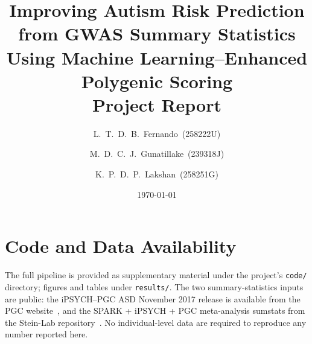 \documentclass[11pt,a4paper]{article}
\title{Improving Autism Risk Prediction from GWAS Summary Statistics
       Using Machine Learning--Enhanced Polygenic Scoring \\[0.3em]
       \large Project Report}
\author[1]{L.~T.~D.~B.~Fernando~(258222U)}
\author[1]{M.~D.~C.~J.~Gunatillake~(239318J)}
\author[1]{K.~P.~D.~P.~Lakshan~(258251G)}
\affil[1]{University of Moratuwa}
\date{\today}
\begin{document}
\maketitle








\section*{Code and Data Availability}
The full pipeline is provided as supplementary material under the
project's \texttt{code/} directory; figures and tables under
\texttt{results/}. The two summary-statistics inputs are public: the
iPSYCH--PGC ASD November 2017 release is available from the PGC
website~\cite{grove2019}, and the SPARK + iPSYCH + PGC meta-analysis
sumstats from the Stein-Lab repository~\cite{matoba2020}. No
individual-level data are required to reproduce any number reported here.



\end{document}
